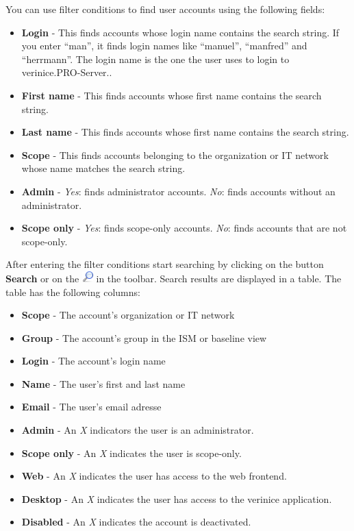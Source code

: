 \documentclass[a4paper,10pt]{book}
\begin{document}
You can use filter conditions to find user accounts using the following fields:
\begin{itemize}
\item \textbf{Login} - This finds accounts whose login name contains the search string. If you enter ``man'', it finds login names like ``manuel'', ``manfred'' and ``herrmann''. The login name is the one the user uses to login to verinice.\textsc{PRO}-Server..
\item \textbf{First name} - This finds accounts whose first name contains the search string.
\item \textbf{Last name} - This finds accounts whose first name contains the search string.
\item \textbf{Scope} - This finds accounts belonging to the organization or IT network whose name matches the search string.
\item \textbf{Admin} - \textit{Yes}: finds administrator accounts. \textit{No}: finds accounts without an administrator.
\item \textbf{Scope only} - \textit{Yes}: finds scope-only accounts. \textit{No}: finds accounts that are not scope-only.
\end{itemize}

After entering the filter conditions start searching by clicking on the button \textbf{Search} or on the \includegraphics[height=2ex]{Icon/search.png} in the toolbar. Search results are displayed in a table. The table has the following columns:
\begin{itemize}
\item \textbf{Scope} - The account’s organization or IT network
\item \textbf{Group} - The account’s group in the ISM or baseline view
\item \textbf{Login} - The account’s login name
\item \textbf{Name} - The user’s first and last name
\item \textbf{Email} - The user’s email adresse
\item \textbf{Admin} - An \textit{X} indicators the user is an administrator.
\item \textbf{Scope only} - An \textit{X} indicates the user is scope-only.
\item \textbf{Web} - An \textit{X} indicates the user has access to the web frontend.
\item \textbf{Desktop} - An \textit{X} indicates the user has access to the verinice application.
\item \textbf{Disabled} - An \textit{X} indicates the account is deactivated.
\end{itemize}
\end{document}
